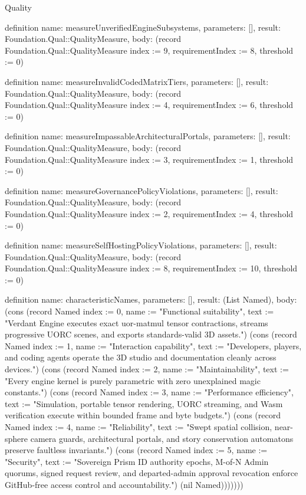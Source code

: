 \begin{lexlean}{Quality}
\begin{semanticmodule}
definition{
  name: measureUnverifiedEngineSubsystems,
  parameters: [],
  result: Foundation.Qual::QualityMeasure,
  body: (record Foundation.Qual::QualityMeasure {index := 9, requirementIndex := 8, threshold := 0})
}

definition{
  name: measureInvalidCodedMatrixTiers,
  parameters: [],
  result: Foundation.Qual::QualityMeasure,
  body: (record Foundation.Qual::QualityMeasure {index := 4, requirementIndex := 6, threshold := 0})
}

definition{
  name: measureImpassableArchitecturalPortals,
  parameters: [],
  result: Foundation.Qual::QualityMeasure,
  body: (record Foundation.Qual::QualityMeasure {index := 3, requirementIndex := 1, threshold := 0})
}

definition{
  name: measureGovernancePolicyViolations,
  parameters: [],
  result: Foundation.Qual::QualityMeasure,
  body: (record Foundation.Qual::QualityMeasure {index := 2, requirementIndex := 4, threshold := 0})
}

definition{
  name: measureSelfHostingPolicyViolations,
  parameters: [],
  result: Foundation.Qual::QualityMeasure,
  body: (record Foundation.Qual::QualityMeasure {index := 8, requirementIndex := 10, threshold := 0})
}

definition{
  name: characteristicNames,
  parameters: [],
  result: (List Named),
  body: (cons (record Named {index := 0, name := "Functional suitability", text := "Verdant Engine executes exact uor-matmul tensor contractions, streams progressive UORC scenes, and exports standards-valid 3D assets."}) (cons (record Named {index := 1, name := "Interaction capability", text := "Developers, players, and coding agents operate the 3D studio and documentation cleanly across devices."}) (cons (record Named {index := 2, name := "Maintainability", text := "Every engine kernel is purely parametric with zero unexplained magic constants."}) (cons (record Named {index := 3, name := "Performance efficiency", text := "Simulation, portable tensor rendering, UORC streaming, and Wasm verification execute within bounded frame and byte budgets."}) (cons (record Named {index := 4, name := "Reliability", text := "Swept spatial collision, near-sphere camera guards, architectural portals, and story conservation automatons preserve faultless invariants."}) (cons (record Named {index := 5, name := "Security", text := "Sovereign Prism ID authority epochs, M-of-N Admin quorums, signed request review, and departed-admin approval revocation enforce GitHub-free access control and accountability."}) (nil Named)))))))
}


\end{semanticmodule}
\end{lexlean}
